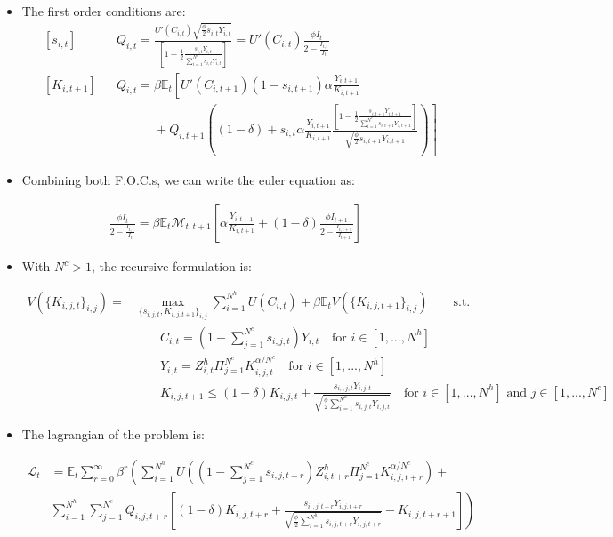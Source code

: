 \documentclass[11pt]{article}
\newcommand{\E}{\mathbb{E}}
\numberwithin{equation}{section}
\begin{document}
\begin{itemize}
	\item The first order conditions are:
	\begin{align*}
	& \left[s_{i,t}\right] && Q_{i,t} = \frac{ U'(C_{i,t})\sqrt{\frac{\phi}{2} s_{i,t} Y_{i,t}}}{\left[1-\frac{1}{2} \frac{s_{i,t} Y_{i,t}}{\sum_{i=1}^{N^c} s_{i,t} Y_{i,t}}\right]} = U'(C_{i,t}) \frac{\phi I_{t}}{2-\frac{I_{i,t}}{I_{t}}} \\
	& \left[K_{i,t+1}\right] && Q_{i,t} = \beta \E_t \left[  U'(C_{i,t+1}) (1- s_{i,t+1}) \alpha \frac{Y_{i,t+1}}{K_{i,t+1}} \right. \\
	&   &&  \left. \quad  \qquad   +   Q_{i,t+1} \left( (1-\delta) + s_{i,t} \alpha \frac{Y_{i,t+1}}{K_{i,t+1}} \frac{ \left[1-\frac{1}{2} \frac{s_{i,t+1} Y_{i,t+1}}{\sum_{i=1}^{N^c} s_{i,t+1} Y_{i,t+1}}\right]}{\sqrt{\frac{\phi}{2} s_{i,t+1} Y_{i,t+1}}} \right) \right]
	\end{align*}
	
	\item Combining both F.O.C.s, we can write the euler equation as:
	
	\begin{align*}
	\frac{\phi I_{t}}{2-\frac{I_{i,t}}{I_{t}}} = \beta \E_t \mathcal{M}_{t,t+1} \left[  \alpha \frac{Y_{i,t+1}}{K_{i,t+1}}    + (1-\delta) 	\frac{\phi I_{t+1}}{2-\frac{I_{i,t+1}}{I_{t+1}}} \right]
	\end{align*}
	
	\item With $N^c > 1$, the recursive formulation is:
	
	
	\begin{align*}
	V\left(\{K_{i,j,t}\}_{i,j}\right) = &\max_{\{s_{i,j,t},K_{i,j,t+1}\}_{i,j}} \sum_{i=1}^{N^h} U(C_{i,t}) + \beta \E_t V(\{K_{i,j,t+1}\}_{i,j}) \qquad \text{s.t.}\\
	&\qquad
	C_{i,t} = (1-\sum_{j=1}^{N^c} s_{i,j,t})Y_{i,t} \quad \text{for } i \in [1,...,N^h]\\
	&\qquad
	Y_{i,t}=Z^h_{i,t} \Pi_{j=1}^{N^c} K_{i,j,t}^{\alpha/N^c}  \quad \text{for } i \in [1,...,N^h]\\
	&\qquad
	K_{i,j,t+1} \leq (1-\delta) K_{i,j,t} + \frac{s_{i,,j,t}Y_{i,j,t}}{\sqrt{\frac{\phi}{2} \sum_{i=1}^{N^h} s_{i,j,t} Y_{i,j,t}}}  \quad \text{for } i \in [1,...,N^h] \text{ and } j \in [1,...,N^c]
	\end{align*}
	
	
	\item The lagrangian of the problem is: 
	
	\begin{align*}
	\mathcal{L}_{t} &= \E_t \sum_{r=0}^{\infty}\beta^r  \left( \sum_{i=1}^{N^h} U\left( (1-\sum_{j=1}^{N^c} s_{i,j,t+r})Z^h_{i,t+r} \Pi_{j=1}^{N^c} K_{i,j,t+r}^{\alpha/N^c}  \right) + \right. \\
& 	\left. \sum_{i=1}^{N^h} \sum_{j=1}^{N^c}  Q_{i,j,t+r} \left[(1-\delta) K_{i,j,t+r} + \frac{s_{i,,j,t+r}Y_{i,j,t+r}}{\sqrt{\frac{\phi}{2} \sum_{i=1}^{N^h} s_{i,j,t+r} Y_{i,j,t+r}}}-K_{i,j,t+r+1}\right] \right)
	\end{align*}
	

\end{itemize}
\end{document}
